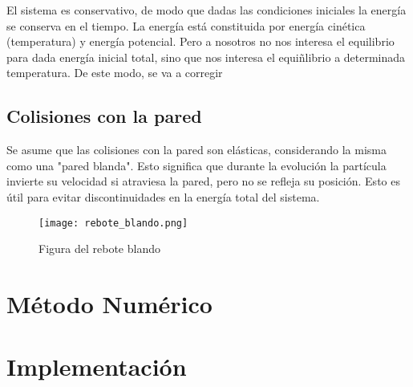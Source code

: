 \documentclass[aps,prb,twocolumn,superscriptaddress,floatfix,longbibliography]{revtex4-2}
\newif\ifptitle
\newif\ifpnumber
\newcounter{para}
\newcommand\ptitle[1]{\par\refstepcounter{para}
{\ifpnumber{\noindent\textcolor{lightgray}{\textbf{\thepara}}\indent}\fi}
{\ifptitle{\textbf{[{#1}]}}\fi}}
\begin{document}
El sistema es conservativo, de modo que dadas las condiciones iniciales la energía se conserva en el tiempo. La energía está constituida por energía cinética (temperatura) y energía potencial. Pero a nosotros no nos interesa el equilibrio para dada energía inicial total, sino que nos interesa el equiñlibrio a determinada temperatura. De este modo, se va a corregir 

\subsection{Colisiones con la pared}

Se asume que las colisiones con la pared son elásticas, considerando la misma como una "pared blanda". Esto significa que durante la evolución la partícula invierte su velocidad si atraviesa la pared, pero no se refleja su posición. Esto es útil para evitar discontinuidades en la energía total del sistema.


\begin{figure}[h]
    \texttt{[image: rebote\_blando.png]}
    \caption{Figura del rebote blando}
     \label{fig:rebote_blando}
\end{figure}

\section{Método Numérico}

\section{Implementación}



\ptitle{¿Qué pasos debe hacer nuestro código para calcular la evolución del gas de electrones?}
\end{document}
